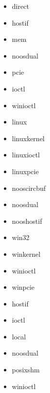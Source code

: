 \begin{description}[leftmargin=0cm]
    \item[control module] \mbox{}
    \begin{multicols}{3}
        \begin{itemize}
            \item direct
            \item hostif
            \item mem
            \item noosdual
            \item pcie
            \item ioctl
            \item winioctl
        \end{itemize}
    \end{multicols}
    
    \item[event handler] \mbox{}
    \begin{multicols}{3}
        \begin{itemize}
            \item linux
            \item linuxkernel
            \item linuxioctl
            \item linuxpcie
            \item nooscircbuf
            \item noosdual
            \item nooshostif
            \item win32
            \item winkernel
            \item winioctl
            \item winpcie
        \end{itemize}
    \end{multicols}
    
    \item[error handler] \mbox{}
    \begin{multicols}{3}
        \begin{itemize}
            \item hostif
            \item ioctl
            \item local
            \item noosdual
            \item posixshm
            \item winioctl
        \end{itemize}
    \end{multicols}
    

\end{description}
